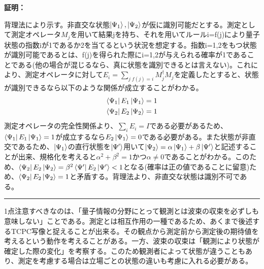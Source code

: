 \documentclass[a4paper,10.5pt]{article}
\numberwithin{equation}{section}
\newenvironment{proofbox}
{\begin{prooflabel}\textbf{証明：}\end{prooflabel}\vspace{0.8em}}
{\par\vspace{1em}\hrule\vspace{1em}}
\begin{document}
\begin{proofbox}
 背理法により示す。非直交な状態$\ket{\Psi_{1}},\ket{\Psi_{2}}$が仮に識別可能だとする。測定として測定オペレータ$M_{j}$を用いて結果jを持ち、それを用いてルールi=f(j)により量子状態の指数iが1であるか2を当てるという状況を想定する。指数i=1,2をもつ状態が識別可能であるとは、f(j)を得られた際にi=1,2が与えられる確率が1であることである(他の場合が混じるなら、真に状態を識別できるとは言えない)。これにより、測定オペレータに対して$E_{i}=\sum_{j\; f(j)=i}M_{j}^{\dagger} M_{j}$を定義したとすると、状態が識別できるなら以下のような関係が成立することがわかる。
 \begin{equation}\begin{split}
     \bra{\Psi_{1}} E_{1}\ket{\Psi_{1}}=1\\
     \bra{\Psi_{2}} E_{2}\ket{\Psi_{2}}=1
 \end{split} \end{equation}
測定オペレータの完全性関係より、$\sum_{i}E_{i}=I$である必要があるため、$\bra{\Psi_{1}} E_{1}\ket{\Psi_{1}}=1$が成立するなら$E_{2}\ket{\Psi_{1}}=0$である必要がある。また状態が非直交であるため、$\ket{\Psi_{1}}$の直行状態を$\ket{\Psi'}$用いて$\ket{\Psi_{2}} = \alpha \ket{\Psi_{1}} +\beta \ket{\Psi'}$と記述することが出来、規格化を考えると$\alpha^{2}+\beta^{2}=1$かつ$\alpha\neq 0$であることがわかる。このため、$\bra{\Psi_{2}} E_{2}\ket{\Psi_{2}}=\beta^{2}\bra{\Psi'}E_{2}\ket{\Psi'}<1$となる(確率は正の値であることに留意)ため、$\bra{\Psi_{2}} E_{2}\ket{\Psi_{2}}=1$と矛盾する。背理法より、非直交な状態は識別不可である。
\end{proofbox}
1点注意すべきなのは、「量子情報の分野にとって観測とは波束の収束を必ずしも意味しない」ことである。測定とは相互作用の一種であるため、あくまで後述するTCPC写像と捉えることが出来る。その観点から測定前から測定後の期待値を考えるという動作を考えることがある。一方、波束の収束は「観測により状態が確定した際の変化」を考察する。このため観測者によって状態が違うこともあり、測定を考慮する場合は立場ごとの状態の違いも考慮に入れる必要がある。\\
 
\end{document}

